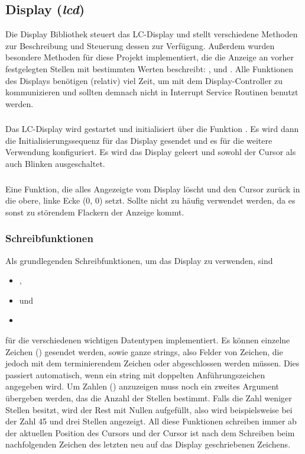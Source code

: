 \subsection{Display (\emph{lcd})}
Die Display Bibliothek steuert das LC-Display und stellt verschiedene Methoden zur Beschreibung und Steuerung dessen zur Verfügung.
Außerdem wurden besondere Methoden für diese Projekt implementiert, die die Anzeige an vorher festgelegten Stellen mit bestimmten Werten beschreibt: ,  und .
\newline
Alle Funktionen des Displays benötigen (relativ) viel Zeit, um mit dem Display-Controller zu kommunizieren und sollten demnach nicht in Interrupt Service Routinen benutzt werden.
\subsubsection{}
Das LC-Display wird gestartet und initialisiert über die Funktion . Es wird dann die Initialisierungssequenz für das Display gesendet und es für die weitere Verwendung konfiguriert. Es wird das Display geleert und sowohl der Cursor als auch Blinken ausgeschaltet.
\subsubsection{}
Eine Funktion, die alles Angezeigte vom Display löscht und den Cursor zurück in die obere, linke Ecke (0, 0) setzt. Sollte nicht zu häufig verwendet werden, da es sonst zu störendem Flackern der Anzeige kommt.
\subsubsection{Schreibfunktionen}
Als grundlegenden Schreibfunktionen, um das Display zu verwenden, sind
\begin{itemize}
    \item {},
    \item {} und
    \item {}
\end{itemize}
für die verschiedenen wichtigen Datentypen implementiert. Es können einzelne Zeichen () gesendet werden, sowie ganze strings, also Felder von Zeichen, die jedoch mit dem terminierendem Zeichen  oder  abgeschlossen werden müssen. Dies passiert automatisch, wenn ein string mit doppelten Anführungszeichen angegeben wird. Um Zahlen () anzuzeigen muss noch ein zweites Argument übergeben werden, das die Anzahl der Stellen bestimmt. Falls die Zahl weniger Stellen besitzt, wird der Rest mit Nullen aufgefüllt, also wird beispielsweise bei der Zahl 45 und drei Stellen  angezeigt.
\newline
All diese Funktionen schreiben immer ab der aktuellen Position des Cursors und der Cursor ist nach dem Schreiben beim nachfolgenden Zeichen des letzten neu auf das Display geschriebenen Zeichens.

